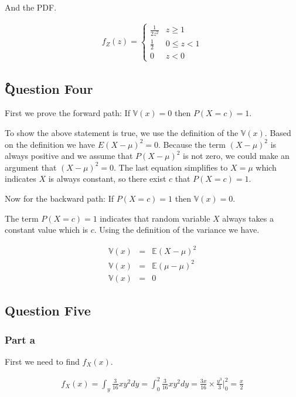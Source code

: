 \documentclass[12pt, a4paper]{book}
\begin{document}
And the PDF.

\begin{eqnarray*}
    f_Z(z) = \begin{cases}
        \frac{1}{2z^2} & z \ge 1 \\
        \frac{1}{2} & 0 \le z < 1 \\
        0 & z < 0
    \end{cases}
\end{eqnarray*}

\subsection*{ْQuestion Four}

First we prove the forward path: If $\mathbb{V}(x) = 0$ then $P(X=c) = 1$.

To show the above statement is true, we use the definition of the $\mathbb{V}(x)$. Based on the definition
we have $E(X - \mu)^2 = 0$. Because the term $(X - \mu)^2$ is always positive and we assume that $P(X - \mu)^2$
is not zero, we could make an argument that $(X-\mu)^2 = 0$.
The last equation simplifies to $X = \mu$ which indicates $X$ is always constant, so there
exist $c$ that $P(X=c) = 1$.

Now for the backward path: If $P(X=c)=1$ then $\mathbb{V}(x) = 0$.

The term $P(X=c)=1$ indicates that random variable $X$ always takes a constant value which is $c$. Using the
definition of the variance we have.

\begin{eqnarray*}
    \mathbb{V}(x) & = & \mathbb{E}(X - \mu)^2 \\
    \mathbb{V}(x) & = & \mathbb{E} (\mu - \mu)^2 \\
    \mathbb{V}(x) & = & 0
\end{eqnarray*}

\subsection*{Question Five}

\subsubsection*{Part a}

First we need to find $f_X(x)$.

\begin{eqnarray*}
    f_X(x) = \int_y \frac{3}{16} xy^2 dy = \int_0^2 \frac{3}{16} xy^2 dy = \frac{3x}{16} \times \frac{y^3}{3}\Big|_0^2 = \frac{x}{2}
\end{eqnarray*}
\end{document}
